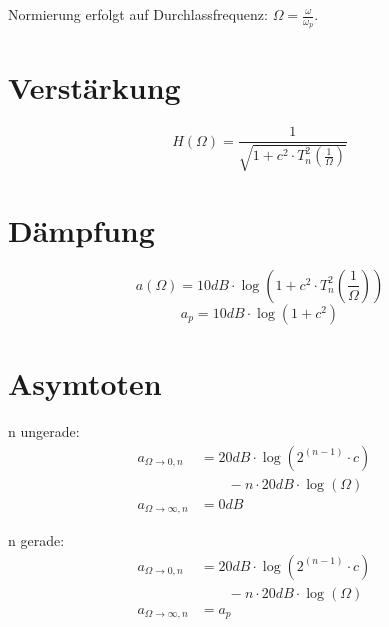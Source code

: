 \documentclass[a4paper, 12pt]{report}
\begin{document}
	Normierung erfolgt auf Durchlassfrequenz: $ \Omega = \frac{\omega}{\omega_p} $.
	\vspace{0.5cm}

    \begin{minipage}[t]{0.5\textwidth}
		\section*{Verstärkung}
	    	\[ H(\Omega) = \frac{1}{\sqrt{1 + c^2 \cdot T^2_n\left(\frac{1}{\Omega}\right)}} \]
    \end{minipage}
    \begin{minipage}[t]{0.5\textwidth}
		\section*{Dämpfung}
		    \[ a(\Omega) = 10dB \cdot \log{\left(1 + c^2 \cdot T^2_n\left(\frac{1}{\Omega}\right)\right)} \]
		   	\[ a_p = 10dB \cdot \log{\left(1+c^2\right)} \]
    \end{minipage}
	
	\vspace{-0.5cm}  
	
\section*{Asymtoten}
    \begin{minipage}[t]{0.5\textwidth}
		n ungerade:
		\begin{align*}
		 	a_{\Omega\rightarrow 0,n} &= 20dB \cdot \log{\left(2^{(n-1)} \cdot c\right)} &\\ &\qquad - n \cdot 20dB \cdot \log{(\Omega)} &\\
		 	a_{\Omega\rightarrow \infty,n} &= 0dB &
		\end{align*}
    \end{minipage}
    \begin{minipage}[t]{0.5\textwidth}
		n gerade:
		\begin{align*}
		 	a_{\Omega\rightarrow 0,n} &= 20dB \cdot \log{\left(2^{(n-1)} \cdot c\right)} &\\ &\qquad - n \cdot 20dB \cdot \log{(\Omega)} &\\
		 	a_{\Omega\rightarrow \infty,n} &= a_p &
		\end{align*}
    \end{minipage}
\end{document}
